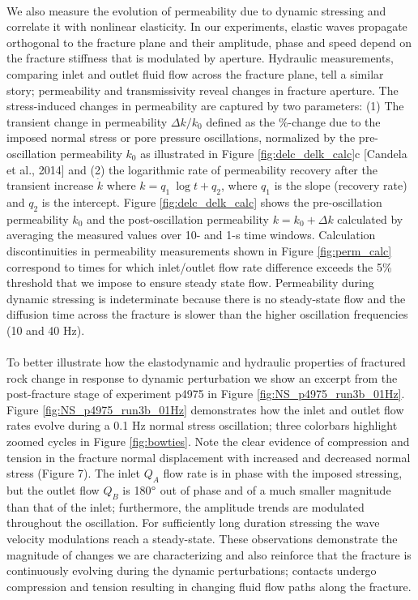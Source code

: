 \documentclass[letterpaper,10pt]{article}
\begin{document}
	\paragraph{}
	We also measure the evolution of permeability due to dynamic stressing and correlate it with nonlinear elasticity. In our experiments, elastic waves propagate orthogonal to the fracture plane and their amplitude, phase and speed depend on the fracture stiffness that is modulated by aperture. Hydraulic measurements, comparing inlet and outlet fluid flow across the fracture plane, tell a similar story; permeability and transmissivity reveal changes in fracture aperture.
	The stress-induced changes in permeability are captured by two parameters: (1) The transient change in permeability $ \Delta k/k_0 $ defined as the \%-change due to the imposed normal stress or pore pressure oscillations, normalized by the pre-oscillation permeability $ k_0 $ as illustrated in Figure \ref{fig:delc_delk_calc}c [Candela et al., 2014] and (2) the logarithmic rate of permeability recovery after the transient increase $ \dot k $ where $ k = q_1\ \log{t} + q_2 $, where $q_1$ is the slope (recovery rate) and $q_2$ is the intercept.
	Figure \ref{fig:delc_delk_calc} shows the pre-oscillation permeability $ k_0 $ and the post-oscillation permeability $ k = k_0 + \Delta k $ calculated by averaging the measured values over 10- and 1-s time windows. Calculation discontinuities in permeability measurements shown in Figure \ref{fig:perm_calc} correspond to times for which inlet/outlet flow rate difference exceeds the 5\% threshold that we impose to ensure steady state flow. Permeability during dynamic stressing is indeterminate because there is no steady-state flow and the diffusion time across the fracture is slower than the higher oscillation frequencies (10 and  40 Hz). 
	
	\paragraph{}
	To better illustrate how the elastodynamic and hydraulic properties of fractured rock change in response to dynamic perturbation we show an excerpt from the post-fracture stage of experiment p4975 in Figure \ref{fig:NS_p4975_run3b_01Hz}.
	Figure  \ref{fig:NS_p4975_run3b_01Hz} demonstrates how the inlet and outlet flow rates evolve during a 0.1 Hz normal stress oscillation; three colorbars highlight zoomed cycles in Figure \ref{fig:bowties}. Note the clear evidence of compression and tension in the fracture normal displacement with increased and decreased normal stress (Figure 7). The inlet $ Q_A $ flow rate is in phase with the imposed stressing, but the outlet flow $ Q_B $ is 180$\degree$ out of phase and of a much smaller magnitude than that of the inlet;  furthermore, the amplitude trends are modulated throughout the oscillation. For sufficiently long duration stressing the wave velocity modulations reach a steady-state. These observations demonstrate the magnitude of changes we are characterizing and also reinforce that the fracture is continuously evolving during the dynamic perturbations; contacts undergo compression and tension resulting in changing fluid flow paths along the fracture.
	
\end{document}
